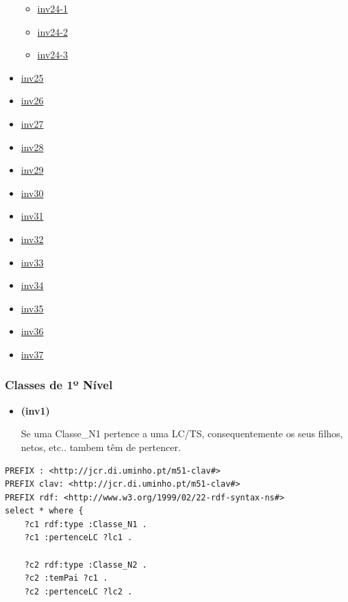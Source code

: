 \documentclass[tikz,runningheads,a4paper]{llncs}
\begin{document}
\begin{subappendices}
\begin{itemize}
  \begin{itemize}
  \tightlist
  \item
    \protect\hyperlink{inv24-1}{inv24-1}
  \item
    \protect\hyperlink{inv24-2}{inv24-2}
  \item
    \protect\hyperlink{inv24-3}{inv24-3}
  \end{itemize}
\item
  \protect\hyperlink{inv25}{inv25}
\item
  \protect\hyperlink{inv26}{inv26}
\item
  \protect\hyperlink{inv27}{inv27}
\item
  \protect\hyperlink{inv28}{inv28}
\item
  \protect\hyperlink{inv29}{inv29}
\item
  \protect\hyperlink{inv30}{inv30}
\item
  \protect\hyperlink{inv31}{inv31}
\item
  \protect\hyperlink{inv32}{inv32}
\item
  \protect\hyperlink{inv33}{inv33}
\item
  \protect\hyperlink{inv34}{inv34}
\item
  \protect\hyperlink{inv35}{inv35}
\item
  \protect\hyperlink{inv36}{inv36}
\item
  \protect\hyperlink{inv37}{inv37}
\end{itemize}

\hypertarget{classes-de-1-nivel}{%
\subsubsection{Classes de 1º Nível}\label{classes-de-1uxba-nuxedvel}}

\begin{itemize}
\tightlist
\item
  \hypertarget{inv1}{\textbf{(inv1)}} Se uma Classe\_N1 pertence a uma LC/TS,
  consequentemente os seus filhos, netos, etc.. tambem têm de pertencer.
\end{itemize}

\begin{lstlisting}[language=sparql, frame=single, basicstyle=\scriptsize]
PREFIX : <http://jcr.di.uminho.pt/m51-clav#>
PREFIX clav: <http://jcr.di.uminho.pt/m51-clav#>
PREFIX rdf: <http://www.w3.org/1999/02/22-rdf-syntax-ns#>
select * where { 
    ?c1 rdf:type :Classe_N1 .
    ?c1 :pertenceLC ?lc1 .
    
    ?c2 rdf:type :Classe_N2 .
    ?c2 :temPai ?c1 .
    ?c2 :pertenceLC ?lc2 .
    

\end{lstlisting}
\end{subappendices}
\end{document}
